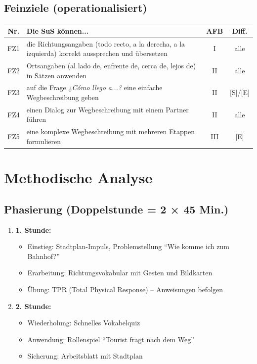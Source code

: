 \documentclass[11pt,a4paper]{article}
\begin{document}
\subsection{Feinziele (operationalisiert)}
\begin{tabular}{|c|p{8cm}|c|c|}
\hline
\textbf{Nr.} & \textbf{Die SuS können...} & \textbf{AFB} & \textbf{Diff.} \\
\hline
FZ1 & die Richtungsangaben (todo recto, a la derecha, a la izquierda) korrekt aussprechen und übersetzen & I & alle \\
\hline
FZ2 & Ortsangaben (al lado de, enfrente de, cerca de, lejos de) in Sätzen anwenden & II & alle \\
\hline
FZ3 & auf die Frage \textit{¿Cómo llego a...?} eine einfache Wegbeschreibung geben & II & [S]/[E] \\
\hline
FZ4 & einen Dialog zur Wegbeschreibung mit einem Partner führen & II & alle \\
\hline
FZ5 & eine komplexe Wegbeschreibung mit mehreren Etappen formulieren & III & [E] \\
\hline
\end{tabular}

\section{Methodische Analyse}

\subsection{Phasierung (Doppelstunde = 2 × 45 Min.)}
\begin{enumerate}
    \item \textbf{1. Stunde:}
    \begin{itemize}
        \item Einstieg: Stadtplan-Impuls, Problemstellung ``Wie komme ich zum Bahnhof?''
        \item Erarbeitung: Richtungsvokabular mit Gesten und Bildkarten
        \item Übung: TPR (Total Physical Response) -- Anweisungen befolgen
    \end{itemize}
    \item \textbf{2. Stunde:}
    \begin{itemize}
        \item Wiederholung: Schnelles Vokabelquiz
        \item Anwendung: Rollenspiel ``Tourist fragt nach dem Weg''
        \item Sicherung: Arbeitsblatt mit Stadtplan
    \end{itemize}
\end{enumerate}
\end{document}
